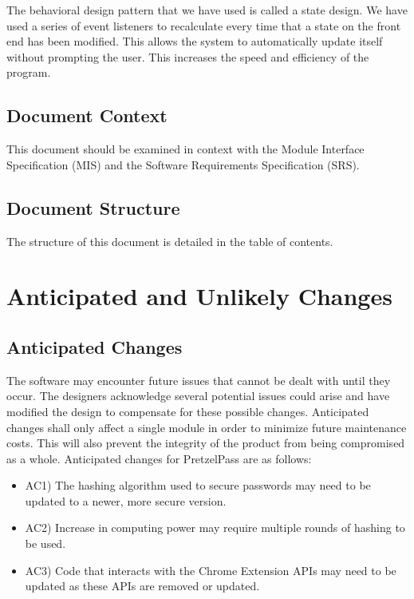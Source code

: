 \documentclass[12pt]{article}
\begin{document}
The behavioral design pattern that we have used is called a state design. We have used a series of event listeners to recalculate every time that a state on the front end has been modified. This allows the system to automatically update itself without prompting the user. This increases the speed and efficiency of the program.

\subsection{Document Context}
This document should be examined in context with the Module Interface Specification (MIS) and the Software Requirements Specification (SRS).

\subsection{Document Structure}
The structure of this document is detailed in the table of contents.

\section{Anticipated and Unlikely Changes}
\subsection{Anticipated Changes}
The software may encounter future issues that cannot be dealt with until they occur.  The designers acknowledge several potential issues could arise and have modified the design to compensate for these possible changes.  Anticipated changes shall only affect a single module in order to minimize future maintenance costs. This will also prevent the integrity of the product from being compromised as a whole. Anticipated changes for PretzelPass are as follows:
\begin{itemize}
\item AC1) The hashing algorithm used to secure passwords may need to be updated to a newer, more secure version.
\item AC2) Increase in computing power may require multiple rounds of hashing to be used.
\item AC3) Code that interacts with the Chrome Extension APIs may need to be updated as these APIs are removed or updated.
\end{itemize}
\end{document}
